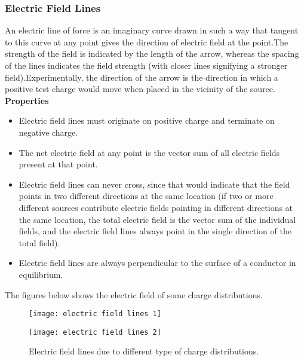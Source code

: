 \subsubsection{Electric Field Lines}
An electric line of force is an imaginary curve drawn in such a way that tangent to this curve at any point gives the direction of electric field at the point.The strength of the field is indicated by the length of the arrow, whereas the spacing of the lines indicates the field strength
(with closer lines signifying a stronger field).Experimentally, the direction of the arrow is the direction in which a positive test charge would move when placed in the vicinity of the source.\\
\textbf{Properties} 
\begin{itemize}
	\item Electric field lines must originate on positive charge and terminate on negative charge.
	\item The net electric field at any point is the vector sum of all electric fields present at that point.
	\item Electric field lines can never cross, since that would indicate that the field points in two different directions at the same location (if two or more different sources contribute electric fields pointing in different directions at the same location, the total electric field is the vector sum of the individual fields, and the electric field lines always point in the
	single direction of the total field).
	\item Electric field lines are always perpendicular to the surface of a
	conductor in equilibrium.
\end{itemize}
The figures below shows the electric field of some charge distributions.
\begin{figure}[H]
	\begin{center}
		\texttt{[image: electric field lines 1]}
	\end{center}
	\begin{center}
		\texttt{[image: electric field lines 2]}
	\end{center}
\caption{Electric field lines due to different type of charge distributions.}
\end{figure}

